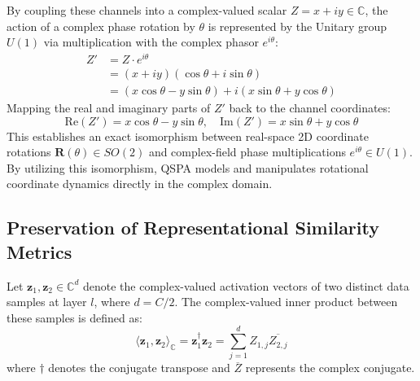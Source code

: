 \documentclass{article}
\begin{document}
By coupling these channels into a complex-valued scalar $Z = x + i y \in \mathbb{C}$, the action of a complex phase rotation by $\theta$ is represented by the Unitary group $U(1)$ via multiplication with the complex phasor $e^{i\theta}$:
\begin{align}
    Z' &= Z \cdot e^{i\theta} \\
       &= (x + i y)(\cos\theta + i \sin\theta) \\
       &= (x \cos\theta - y \sin\theta) + i(x \sin\theta + y \cos\theta)
\end{align}
Mapping the real and imaginary parts of $Z'$ back to the channel coordinates:
\begin{equation}
    \text{Re}(Z') = x \cos\theta - y \sin\theta, \quad \text{Im}(Z') = x \sin\theta + y \cos\theta
\end{equation}
This establishes an exact isomorphism between real-space 2D coordinate rotations $\mathbf{R}(\theta) \in SO(2)$ and complex-field phase multiplications $e^{i\theta} \in U(1)$. By utilizing this isomorphism, QSPA models and manipulates rotational coordinate dynamics directly in the complex domain.

\subsection{Preservation of Representational Similarity Metrics}
Let $\mathbf{z}_1, \mathbf{z}_2 \in \mathbb{C}^d$ denote the complex-valued activation vectors of two distinct data samples at layer $l$, where $d = C/2$. The complex-valued inner product between these samples is defined as:
\begin{equation}
    \langle \mathbf{z}_1, \mathbf{z}_2 \rangle_{\mathbb{C}} = \mathbf{z}_1^\dagger \mathbf{z}_2 = \sum_{j=1}^d Z_{1, j} \overline{Z_{2, j}}
\end{equation}
where $\dagger$ denotes the conjugate transpose and $\overline{Z}$ represents the complex conjugate.
\end{document}
